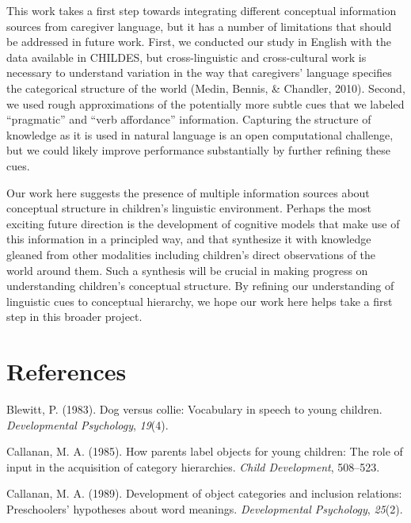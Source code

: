 \documentclass[english,,man,floatsintext]{apa6}
\begin{document}
This work takes a first step towards integrating different conceptual information sources from caregiver language, but it has a number of limitations that should be addressed in future work. First, we conducted our study in English with the data available in CHILDES, but cross-linguistic and cross-cultural work is necessary to understand variation in the way that caregivers' language specifies the categorical structure of the world (Medin, Bennis, \& Chandler, 2010). Second, we used rough approximations of the potentially more subtle cues that we labeled \enquote{pragmatic} and \enquote{verb affordance} information. Capturing the structure of knowledge as it is used in natural language is an open computational challenge, but we could likely improve performance substantially by further refining these cues.

Our work here suggests the presence of multiple information sources about conceptual structure in children's linguistic environment. Perhaps the most exciting future direction is the development of cognitive models that make use of this information in a principled way, and that synthesize it with knowledge gleaned from other modalities including children's direct observations of the world around them. Such a synthesis will be crucial in making progress on understanding children's conceptual structure. By refining our understanding of linguistic cues to conceptual hierarchy, we hope our work here helps take a first step in this broader project.

\hypertarget{references}{%
\section{References}\label{references}}

\setlength{\parindent}{-0.5in}
\setlength{\leftskip}{0.5in}

\hypertarget{refs}{}
\leavevmode\hypertarget{ref-blewitt1983}{}%
Blewitt, P. (1983). Dog versus collie: Vocabulary in speech to young children. \emph{Developmental Psychology}, \emph{19}(4).

\leavevmode\hypertarget{ref-callanan1985}{}%
Callanan, M. A. (1985). How parents label objects for young children: The role of input in the acquisition of category hierarchies. \emph{Child Development}, 508--523.

\leavevmode\hypertarget{ref-callanan1989}{}%
Callanan, M. A. (1989). Development of object categories and inclusion relations: Preschoolers' hypotheses about word meanings. \emph{Developmental Psychology}, \emph{25}(2).
\end{document}
